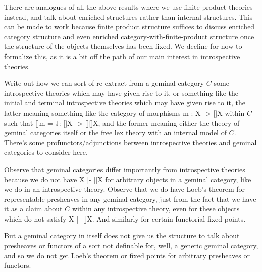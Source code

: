There are analogues of all the above results where we use finite product theories instead, and talk about enriched structures rather than internal structures. This can be made to work because finite product structure suffices to discuss enriched category structure and even enriched category-with-finite-product structure once the structure of the objects themselves has been fixed. We decline for now to formalize this, as it is a bit off the path of our main interest in introspective theories. 

\begin{TODOblock}
Write out how we can sort of re-extract from a geminal category $C$ some introspective theories which may have given rise to it, or something like the initial and terminal introspective theories which may have given rise to it, the latter meaning something like the category of morphisms m : X -> []X within $C$ such that []m = J: []X -> [][]X, and the former meaning either the theory of geminal categories itself or the free lex theory with an internal model of $C$. There's some profunctors/adjunctions between introspective theories and geminal categories to consider here.
\end{TODOblock}

\begin{TODOblock}
Observe that geminal categories differ importantly from introspective theories because we do not have X |- []X for arbitrary objects in a geminal category, like we do in an introspective theory. Observe that we do have Loeb's theorem for representable presheaves in any geminal category, just from the fact that we have it as a claim about $C$ within any introspective theory, even for these objects which do not satisfy X |- []X. And similarly for certain functorial fixed points.

But a geminal category in itself does not give us the structure to talk about presheaves or functors of a sort not definable for, well, a generic geminal category, and so we do not get Loeb's theorem or fixed points for arbitrary presheaves or functors.
\end{TODOblock}



